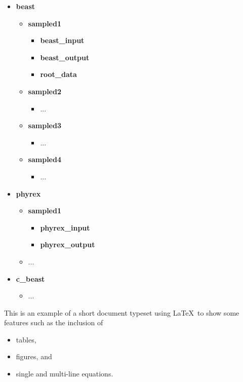 \begin{itemize}
\item \textbf{beast}
\begin{itemize}
\item \textbf{sampled1}
\begin{itemize}
\item \textbf{beast\_input}
\item \textbf{beast\_output}
\item \textbf{root\_data}
\end{itemize}
\item \textbf{sampled2}
\begin{itemize}
\item ...
\end{itemize}
\item \textbf{sampled3}
\begin{itemize}
\item ...
\end{itemize}
\item \textbf{sampled4}
\begin{itemize}
\item ...
\end{itemize}
\end{itemize}

\item \textbf{phyrex}
\begin{itemize}
\item \textbf{sampled1}
\begin{itemize}
\item \textbf{phyrex\_input}
\item \textbf{phyrex\_output}
\end{itemize}
\item ...

\end{itemize}

\item \textbf{c\_beast}
\begin{itemize}
\item ...
\end{itemize}





\end{itemize}

\clearpage


This is an example of a short document typeset using \LaTeX\ to show
some features such as the inclusion of
\begin{itemize}
\item tables,
\item figures, and
\item single and multi-line equations.
\end{itemize}


